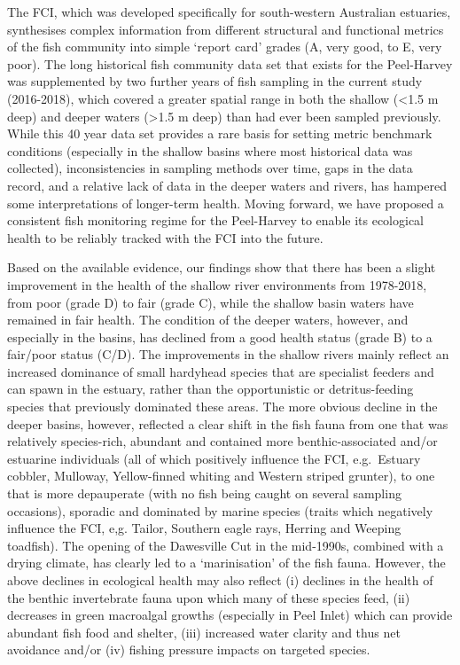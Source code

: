 \documentclass[
]{book}
\begin{document}
The FCI, which was developed specifically for south-western Australian estuaries, synthesises complex information from different structural and functional metrics of the fish community into simple `report card' grades (A, very good, to E, very poor). The long historical fish community data set that exists for the Peel-Harvey was supplemented by two further years of fish sampling in the current study (2016-2018), which covered a greater spatial range in both the shallow (\textless1.5 m deep) and deeper waters (\textgreater1.5 m deep) than had ever been sampled previously. While this 40 year data set provides a rare basis for setting metric benchmark conditions (especially in the shallow basins where most historical data was collected), inconsistencies in sampling methods over time, gaps in the data record, and a relative lack of data in the deeper waters and rivers, has hampered some interpretations of longer-term health. Moving forward, we have proposed a consistent fish monitoring regime for the Peel-Harvey to enable its ecological health to be reliably tracked with the FCI into the future.~

Based on the available evidence, our findings show that there has been a slight improvement in the health of the shallow river environments from 1978-2018, from poor (grade D) to fair (grade C), while the shallow basin waters have remained in fair health. The condition of the deeper waters, however, and especially in the basins, has declined from a good health status (grade B) to a fair/poor status (C/D). The improvements in the shallow rivers mainly reflect an increased dominance of small hardyhead species that are specialist feeders and can spawn in the estuary, rather than the opportunistic or detritus-feeding species that previously dominated these areas. The more obvious decline in the deeper basins, however, reflected a clear shift in the fish fauna from one that was relatively species-rich, abundant and contained more benthic-associated and/or estuarine individuals (all of which positively influence the FCI, e.g.~Estuary cobbler, Mulloway, Yellow-finned whiting and Western striped grunter), to one that is more depauperate (with no fish being caught on several sampling occasions), sporadic and dominated by marine species (traits which negatively influence the FCI, e,g. Tailor, Southern eagle rays, Herring and Weeping toadfish). The opening of the Dawesville Cut in the mid-1990s, combined with a drying climate, has clearly led to a `marinisation' of the fish fauna. However, the above declines in ecological health may also reflect (i) declines in the health of the benthic invertebrate fauna upon which many of these species feed, (ii) decreases in green macroalgal growths (especially in Peel Inlet) which can provide abundant fish food and shelter, (iii) increased water clarity and thus net avoidance and/or (iv) fishing pressure impacts on targeted species.
\end{document}
